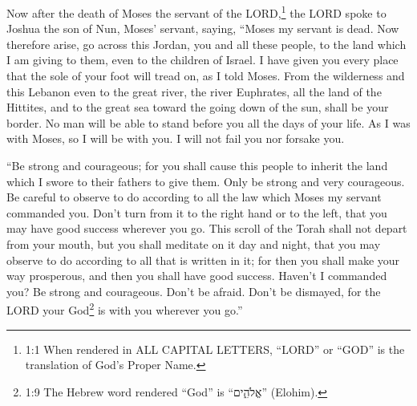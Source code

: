 




\vspace{-1.36in}

\mychapter{} \myverse*{}Now after the death of Moses the servant of the LORD,\footnote{1:1 When rendered in ALL CAPITAL LETTERS, “LORD” or “GOD” is the translation of God’s Proper Name.}
the LORD spoke to Joshua the son of Nun, Moses’ servant, saying,
\myverse{}“Moses my servant is dead. Now therefore arise, go across this Jordan, you and
all these people, to the land which I am giving to them, even to the children of Israel.
\myverse{}I have given you every place that the sole of your foot will tread on, as I
told Moses.
\myverse{}From the wilderness and this Lebanon even to the great river, the river Euphrates,
all the land of the Hittites, and to the great sea toward the going down of the sun, shall be your border.
\myverse{}No man will be able to stand before you all the days of your life. As I was
with Moses, so I will be with you. I will not fail you nor forsake you.

\myverse{}“Be strong and courageous; for you shall cause this people to inherit
the land which I swore to their fathers to give them.
\myverse{}Only be strong and very courageous. Be careful to observe to do according to
all the law which Moses my servant commanded you. Don’t turn from it to the right hand or to the left,
that you may have good success wherever you go.
\myverse{}This scroll of the Torah shall not depart from your mouth, but you shall meditate
on it day and night, that you may observe to do according to all that is written in it; for then you shall
make your way prosperous, and then you shall have good success.
\myverse{}Haven’t I commanded you? Be strong and courageous. Don’t be afraid. Don’t be
dismayed, for the LORD your God\footnote{1:9 The Hebrew word rendered “God” is “אֱלֹהִ֑ים” (Elohim).} is with you wherever
you go.”

